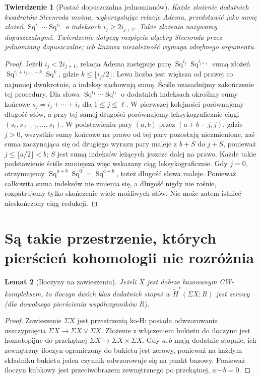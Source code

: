 \documentclass[11pt,a4paper,oneside]{report}
\theoremstyle{plain}
\newtheorem{twierdzenie}{Twierdzenie}[section]
\newtheorem{lemat}[twierdzenie]{Lemat}
\theoremstyle{definition}
\theoremstyle{remark}
\begin{document}
\begin{twierdzenie}[Postać dopuszczalna jednomianów]
Każde złożenie dodatnich kwadratów Steenroda można,
wykorzystując relacje Adema, przedstawić jako sumę
złożeń
$\operatorname{Sq}^{i_1}\cdots\operatorname{Sq}^{i_r}$
o indeksach $i_j\ge2i_{j+1}$. Takie złożenia nazywamy
\emph{dopuszczalnymi}. Twierdzenie dotyczy rozpięcia
algebry Steenroda przez jednomiany dopuszczalne;
ich liniowa niezależność wymaga odrębnego argumentu.
\end{twierdzenie}
\begin{proof}
Jeżeli $i_j<2i_{j+1}$, relacja Adema zastępuje
parę $\operatorname{Sq}^{i_j}\operatorname{Sq}^{i_{j+1}}$
sumą złożeń $\operatorname{Sq}^{i_j+i_{j+1}-k}\operatorname{Sq}^{k}$,
gdzie $k\le\lfloor i_j/2\rfloor$.
Lewa liczba jest większa od prawej co najmniej dwukrotnie,
a indeksy zachowują sumę.
Ściśle uzasadnijmy zakończenie tej procedury. Dla słowa
$\operatorname{Sq}^{i_1}\cdots\operatorname{Sq}^{i_\ell}$
o dodatnich indeksach określmy sumy końcowe
$s_j=i_j+\cdots+i_\ell$ dla $1\le j\le\ell$.
W pierwszej kolejności porównujemy długość słów, a przy
tej samej długości porównujemy leksykograficznie ciągi
$(s_\ell,s_{\ell-1},\ldots,s_1)$. W podstawieniu
pary $(a,b)$ przez $(a+b-j,j)$, gdzie $j>0$,
wszystkie sumy końcowe na prawo od tej pary pozostają
niezmienione, zaś suma zaczynająca się od drugiego
wyrazu pary maleje z $b+S$ do $j+S$, ponieważ
$j\le\lfloor a/2\rfloor<b$; $S$ jest sumą
indeksów leżących jeszcze dalej na prawo.
Każde takie podstawienie ściśle zmniejsza więc
wskazany ciąg leksykograficznie. Gdy $j=0$, otrzymujemy
$\operatorname{Sq}^{a+b}\operatorname{Sq}^0=
\operatorname{Sq}^{a+b}$, toteż długość słowa maleje.
Ponieważ całkowita suma indeksów nie zmienia się,
a długość nigdy nie rośnie, rozpatrujemy tylko skończenie
wiele możliwych słów. Nie może zatem istnieć nieskończony
ciąg redukcji.
\end{proof}

\section{Są takie przestrzenie, których pierścień kohomologii nie rozróżnia}
\begin{lemat}[Iloczyny na zawieszeniu]
\label{lem:susp-cupzero-v8}
Jeżeli $X$ jest dobrze bazowanym CW-kompleksem,
to iloczyn dwóch klas dodatnich stopni w
$\widetilde H^*(\Sigma X;R)$ jest zerowy
(dla dowolnego pierścienia współczynników $R$).
\end{lemat}
\begin{proof}
Zawieszenie $\Sigma X$ jest przestrzenią ko-H: posiada
odwzorowanie uszczypnięcia
$\Sigma X\to\Sigma X\vee\Sigma X$.
Złożenie z włączeniem bukietu do iloczynu jest
homotopijne do przekątnej
$\Sigma X\to\Sigma X\times\Sigma X$.
Gdy $a,b$ mają dodatnie stopnie, ich zewnętrzny
iloczyn ograniczony do bukietu jest zerowy,
ponieważ na każdym składniku bukietu jeden czynnik
odwzorowuje się na punkt bazowy. Ponieważ iloczyn kubkowy
jest przeciwobrazem zewnętrznego po przekątnej,
$a\smile b=0$.
\end{proof}
\end{document}
